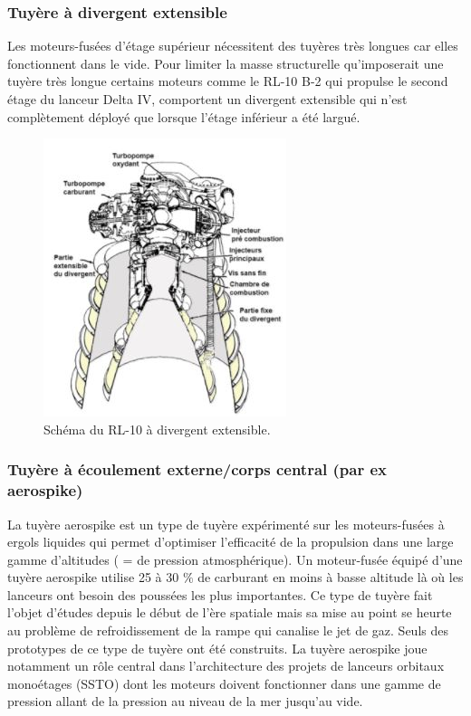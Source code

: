 \documentclass{report}
\begin{document}
\subsubsection{Tuyère à divergent extensible}

Les moteurs-fusées d'étage supérieur nécessitent des tuyères très longues car elles fonctionnent dans le vide. Pour limiter la masse structurelle qu'imposerait une tuyère très longue certains moteurs comme le RL-10 B-2 qui propulse le second étage du lanceur Delta IV, comportent un divergent extensible qui n'est complètement déployé que lorsque l'étage inférieur a été largué.

\begin{figure}[h!]
    \centering
    \includegraphics[scale=1]{49.JPG}
    \caption{Schéma du RL-10 à divergent extensible.}
    \label{49}
\end{figure}

\subsubsection{Tuyère à écoulement externe/corps central (par ex aerospike)}

La tuyère aerospike est un type de tuyère expérimenté sur les moteurs-fusées à ergols liquides qui permet d'optimiser l'efficacité de la propulsion dans une large gamme d'altitudes ( = de pression atmosphérique). Un moteur-fusée équipé d'une tuyère aerospike utilise 25 à 30 $\%$ de carburant en moins à basse altitude là où les lanceurs ont besoin des poussées les plus importantes. Ce type de tuyère fait l'objet d'études depuis le début de l'ère spatiale mais sa mise au point se heurte au problème de refroidissement de la rampe qui canalise le jet de gaz. Seuls des prototypes de ce type de tuyère ont été construits. La tuyère aerospike joue notamment un rôle central dans l’architecture des projets de lanceurs orbitaux monoétages (SSTO) dont les moteurs doivent fonctionner dans une gamme de pression allant de la pression au niveau de la mer jusqu'au vide.
\end{document}

